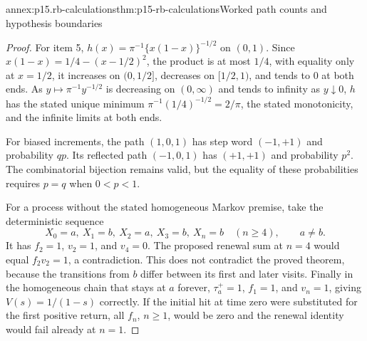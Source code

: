 \begin{annexitem}{annex:p15.rb-calculations}{thm:p15-rb-calculations}{Worked path counts and hypothesis boundaries}
\begin{proof}
For item 5, \(h(x)=\pi^{-1}\{x(1-x)\}^{-1/2}\) on \((0,1)\).
Since \(x(1-x)=1/4-(x-1/2)^2\), the product is at most \(1/4\), with
equality only at \(x=1/2\), it increases on \((0,1/2]\), decreases on
\([1/2,1)\), and tends to \(0\) at both ends. As
\(y\mapsto\pi^{-1}y^{-1/2}\) is decreasing on \((0,\infty)\) and tends
to infinity as \(y\downarrow0\), \(h\) has the stated unique minimum
\(\pi^{-1}(1/4)^{-1/2}=2/\pi\), the stated monotonicity, and the
infinite limits at both ends.

For biased increments, the path \((1,0,1)\) has step word
\((-1,+1)\) and probability \(qp\).
Its reflected path \((-1,0,1)\) has \((+1,+1)\) and
probability \(p^2\). The combinatorial bijection remains
valid, but the equality of these probabilities requires \(p=q\)
when \(0<p<1\).

For a process without the stated homogeneous Markov premise,
take the deterministic sequence
\[
 X_0=a,\ X_1=b,\ X_2=a,\ X_3=b,\ X_n=b\quad(n\geq4),
 \qquad a\ne b.
 \]
It has \(f_2=1\), \(v_2=1\), and \(v_4=0\).
The proposed renewal sum at \(n=4\) would equal
\(f_2v_2=1\), a contradiction. This does not contradict the
proved theorem, because the transitions from \(b\) differ
between its first and later visits.
Finally in the homogeneous chain that stays at \(a\) forever,
\(\tau_a^+=1\), \(f_1=1\), and \(v_n=1\), giving
\(V(s)=1/(1-s)\) correctly.
If the initial hit at time zero were substituted for the first
positive return, all \(f_n\), \(n\geq1\), would be zero and
the renewal identity would fail already at \(n=1\).
\end{proof}
\end{annexitem}
